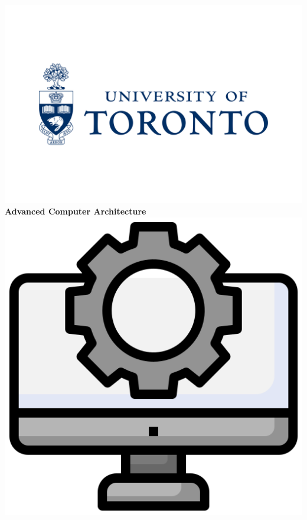 \begin{center}
    
    \includegraphics[scale=0.1]{commons/uoft.png}
    \\
    \vspace*{5mm}
    \textbf{\Huge{Advanced Computer Architecture}}
    \hspace*{1mm}
    \vspace*{5mm}
    \includegraphics[scale=0.12]{commons/course.png}
    \\
    \vspace*{5mm}

\end{center}
